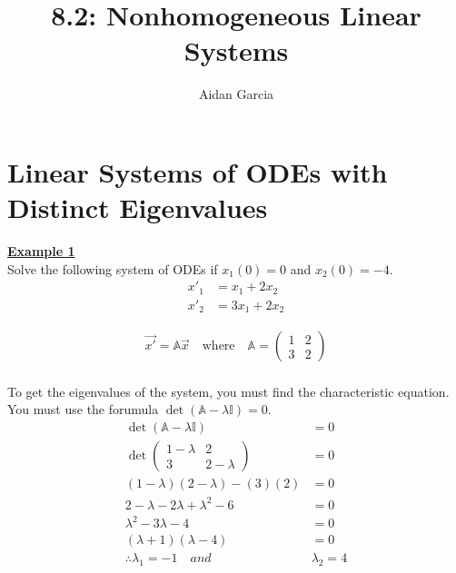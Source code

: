 \documentclass{jhwhw}
\author{Aidan Garcia}
\title{8.2: Nonhomogeneous Linear Systems}
\begin{document}
\maketitle

\section{Linear Systems of ODEs with Distinct Eigenvalues}

{\Large\underline{\textbf{Example 1}}}
\\[\baselineskip]
Solve the following system of ODEs if \(x_1(0)=0\) and \(x_2(0)=-4\).
\\
\begin{align*}
x'_1 & = x_1 + 2x_2 \\
x'_2 & = 3x_1 + 2x_2
\end{align*} 

\begin{align*}
\vec{x'} = \mathbb{A}\vec{x} \quad \textrm{where} \quad \mathbb{A} = \begin{pmatrix}
    1 & 2 \\ 3 & 2
\end{pmatrix}
\end{align*}
\\
To get the eigenvalues of the system, you must find the characteristic equation. You must use the forumula \(\det(\mathbb{A} - \lambda \mathbb{I}  ) = 0\).
\\
\begin{align*}
\det(\mathbb{A} - \lambda \mathbb{I} ) & = 0 \\
\det \begin{pmatrix}
    1-\lambda & 2 \\ 3 & 2-\lambda 
\end{pmatrix} & = 0 \\
(1-\lambda)(2-\lambda)-(3)(2) & = 0 \\
2-\lambda - 2 \lambda + \lambda ^2 - 6 & = 0 \\
\lambda ^2 - 3\lambda  - 4 & = 0 \\
(\lambda +1)(\lambda - 4) & = 0 \\
\therefore \lambda_1 = -1 \quad and \quad & \lambda_2 = 4 
\end{align*}
\end{document}
